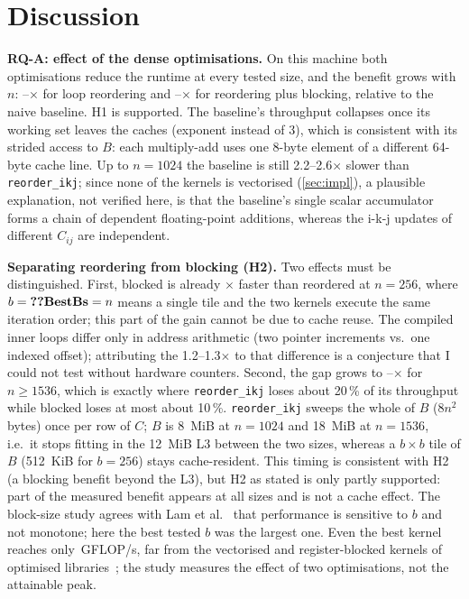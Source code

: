 \documentclass[conference,a4paper]{IEEEtran}
\begin{document}
\section{Discussion}
\label{sec:discussion}
\textbf{RQ-A: effect of the dense optimisations.} On this machine both optimisations reduce the runtime at
every tested size, and the benefit grows with $n$: --$\times$ for loop reordering
and --$\times$ for reordering plus blocking, relative to the naive baseline. H1
is supported. The baseline's throughput collapses once its working set leaves the caches (exponent
 instead of 3), which is consistent with its strided access to $B$: each multiply-add uses one
8-byte element of a different 64-byte cache line. Up to $n=1024$ the baseline is still 2.2--2.6$\times$
slower than \texttt{reorder\_ikj}; since none of the kernels is vectorised (\cref{sec:impl}), a plausible
explanation, not verified here, is that the baseline's single scalar accumulator forms a chain of dependent
floating-point additions, whereas the i-k-j updates of different $C_{ij}$ are independent.

\textbf{Separating reordering from blocking (H2).} Two effects must be distinguished. First, blocked is
already $\times$ faster than reordered at $n=256$, where $b=\val{BestBs}=n$ means a
single tile and the two kernels execute the same iteration order; this part of the gain cannot be due to
cache reuse. The compiled inner loops differ only in address arithmetic (two pointer increments vs.\ one
indexed offset); attributing the 1.2--1.3$\times$ to that difference is a conjecture that I could not test
without hardware counters. Second, the gap grows to --$\times$
for $n\ge 1536$, which is exactly where \texttt{reorder\_ikj} loses about 20\,\% of its throughput while
blocked loses at most about 10\,\%. \texttt{reorder\_ikj} sweeps the whole of $B$ ($8n^2$ bytes) once per row of $C$; $B$ is
\SI{8}{MiB} at $n=1024$ and \SI{18}{MiB} at $n=1536$, i.e.\ it stops fitting in the \SI{12}{MiB} L3 between the
two sizes, whereas a $b\times b$ tile of $B$ (\SI{512}{KiB} for $b=256$) stays cache-resident. This timing is
consistent with H2 (a blocking benefit beyond the L3), but H2 as stated is only partly supported: part of the
measured benefit appears at all sizes and is not a cache effect. The block-size study agrees with Lam et
al.~\cite{lam1991} that performance is sensitive to $b$ and not monotone; here the best tested $b$ was the
largest one. Even the best kernel reaches only \,GFLOP/s, far from the
vectorised and register-blocked kernels of optimised libraries~\cite{goto2008}; the study measures the effect
of two optimisations, not the attainable peak.
\end{document}
